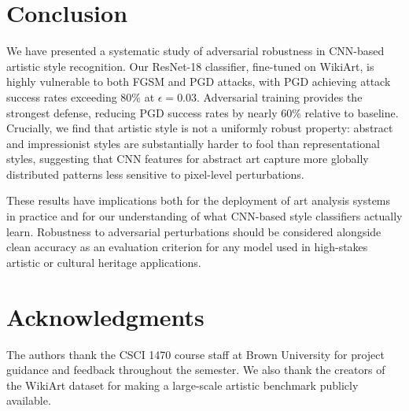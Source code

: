 \documentclass[conference]{IEEEtran}
\begin{document}
\section{Conclusion}

We have presented a systematic study of adversarial robustness in CNN-based artistic style recognition. Our ResNet-18 classifier, fine-tuned on WikiArt, is highly vulnerable to both FGSM and PGD attacks, with PGD achieving attack success rates exceeding 80\% at $\epsilon=0.03$. Adversarial training provides the strongest defense, reducing PGD success rates by nearly 60\% relative to baseline. Crucially, we find that artistic style is not a uniformly robust property: abstract and impressionist styles are substantially harder to fool than representational styles, suggesting that CNN features for abstract art capture more globally distributed patterns less sensitive to pixel-level perturbations.

These results have implications both for the deployment of art analysis systems in practice and for our understanding of what CNN-based style classifiers actually learn. Robustness to adversarial perturbations should be considered alongside clean accuracy as an evaluation criterion for any model used in high-stakes artistic or cultural heritage applications.

\section*{Acknowledgments}
The authors thank the CSCI 1470 course staff at Brown University for project guidance and feedback throughout the semester. We also thank the creators of the WikiArt dataset for making a large-scale artistic benchmark publicly available.
\end{document}
